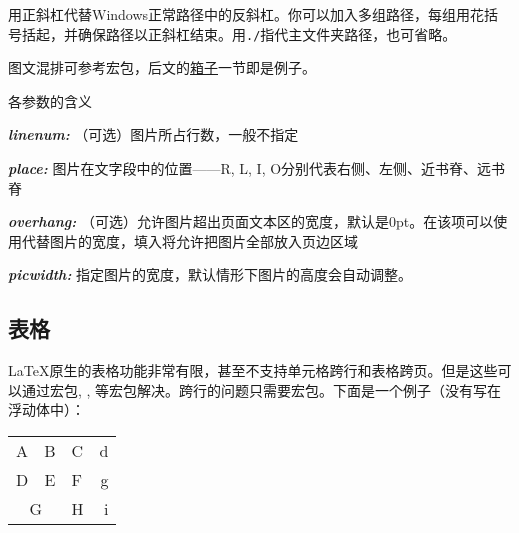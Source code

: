 用正斜杠代替Windows正常路径中的反斜杠。你可以加入多组路径，每组用花括号括起，并确保路径以正斜杠结束。用\verb|./|指代主文件夹路径，也可省略。\dpar

图文混排可参考宏包，后文的\hyperref[sec:box]{箱子}一节即是例子。
\begin{latex}
\end{latex}

各参数的含义
\begin{inlinee}
\item {\bfseries\itshape linenum:} （可选）图片所占行数，一般不指定
\item {\bfseries\itshape place:} 图片在文字段中的位置——R, L, I, O分别代表右侧、左侧、近书脊、远书脊
\item {\bfseries\itshape overhang:} （可选）允许图片超出页面文本区的宽度，默认是0pt。在该项可以使用代替图片的宽度，填入将允许把图片全部放入页边区域
\item {\bfseries\itshape picwidth:} 指定图片的宽度，默认情形下图片的高度会自动调整。
\end{inlinee}

\subsection{表格}
\LaTeX 原生的表格功能非常有限，甚至不支持单元格跨行和表格跨页。但是这些可以通过宏包, , 等宏包解决。跨行的问题只需要宏包。下面是一个例子（没有写在浮动体中）：

\begin{codeshow}
\begin{center}
  \begin{tabular}[c]{|l|c||p{3em}
    r@{-}} \hline\hline
    A & B & C & d\\D & E & F & g\\
    \cline{1-2}
    \multicolumn{2}{|c|}{G}&H&i\\
    \hline
  \end{tabular}
\end{center}
\end{codeshow}

